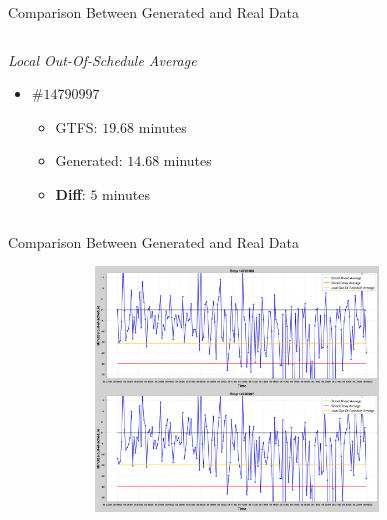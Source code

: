 \documentclass[xcolor=dvipsnames,table]{beamer}
\begin{document}
\begin{frame}{Comparison Between Generated and Real Data}
\begin{columns}
\begin{block}{\textit{Local Out-Of-Schedule Average}}
\begin{itemize}
\begin{itemize}
                                        \end{itemize}
                                \item $\#14790997$ 
                                        \begin{itemize}
                                                \item GTFS: $19.68$ minutes 
                                                \item Generated: $14.68$ minutes 
                                                \item \textbf{Diff}: $5$ minutes 
                                        \end{itemize}
                        \end{itemize}
                \end{block}
        \end{columns}
\end{frame}
\begin{frame}{Comparison Between Generated and Real Data}
        \begin{figure}[H]
                \centering
                \includegraphics[height=6.5cm,width=10cm]{images/stops2_generated.png}
        \end{figure}
\end{frame}
\end{document}
